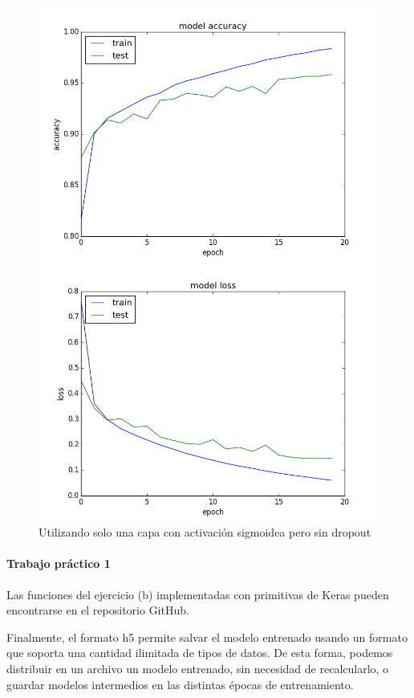 \documentclass[11pt,spanish]{article}
\begin{document}
\begin{figure}[tpb]
\centering
\begin{minipage}{.5\textwidth}
  \centering
  \includegraphics[width=1\linewidth]{../ex2a5_acc.png}
\end{minipage}%
\begin{minipage}{.5\textwidth}
  \centering
  \includegraphics[width=1\linewidth]{../ex2a5_loss.png}
\end{minipage}
\caption{Utilizando solo una capa con activación sigmoidea pero sin dropout}
\label{fig:ex2a5}
\end{figure}

\paragraph{Trabajo práctico 1} Las funciones del ejercicio (b) implementadas con primitivas de Keras pueden encontrarse en el repositorio GitHub.

Finalmente, el formato h5 permite salvar el modelo entrenado usando un formato que soporta una cantidad ilimitada de tipos de datos. De esta forma, podemos distribuir en un archivo un modelo entrenado, sin necesidad de recalcularlo, o guardar modelos intermedios en las distintas épocas de entrenamiento.
\end{document}
